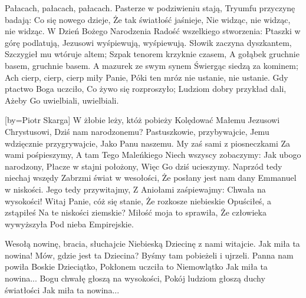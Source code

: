     Pałacach, pałacach, pałacach.
\endchorus
\beginverse
    Pasterze w podziwieniu stają,
    Tryumfu przyczynę badają:
\endverse
\beginchorus
    Co się nowego dzieje,
    Że tak światłość jaśnieje,
    Nie widząc, nie widząc, nie widząc.
\endchorus
\endsong
\beginverse
    W Dzień Bożego Narodzenia
    Radość wszelkiego stworzenia:
    Ptaszki w górę podlatują,
    Jezusowi wyśpiewują, wyśpiewują.
\endverse
\beginverse
    Słowik zaczyna dyszkantem,
    Szczygieł mu wtóruje altem;
    Szpak tenorem krzyknie czasem,
    A gołąbek gruchnie basem, gruchnie basem.
\endverse
\beginverse
    A mazurek ze swym synem
    Świergąc siedzą za kominem;
    Ach cierp, cierp, cierp miły Panie,
    Póki ten mróz nie ustanie, nie ustanie.
\endverse
\beginverse
    Gdy ptactwo Boga uczciło,
    Co żywo się rozproszyło;
    Ludziom dobry przykład dali,
    Ażeby Go uwielbiali, uwielbiali.
\endverse
\endsong

[by={Piotr Skarga}]
\beginverse
    W żłobie leży, któż pobieży
    Kolędować Małemu
    Jezusowi Chrystusowi,
    Dziś nam narodzonemu?
\endverse
\beginchorus
        Pastuszkowie, przybywajcie,
        Jemu wdzięcznie przygrywajcie,
        Jako Panu naszemu.
\endchorus
\beginverse
    My zaś sami z piosneczkami
    Za wami pośpieszymy,
    A tam Tego Maleńkiego
    Niech wszyscy zobaczymy:
\endverse
\beginchorus
        Jak ubogo narodzony,
        Płacze w stajni położony,
        Więc Go dziś ucieszymy.
\endchorus
\beginverse
    Naprzód tedy niechaj wszędy
    Zabrzmi świat w wesołości,
    Że posłany jest nam dany
    Emmanuel w niskości.
\endverse
\beginchorus
        Jego tedy przywitajmy,
        Z Aniołami zaśpiewajmy:
        Chwała na wysokości!
\endchorus
\beginverse
    Witaj Panie, cóż się stanie,
    Że rozkosze niebieskie
    Opuściłeś, a zstąpiłeś
    Na te niskości ziemskie?
\endverse
\beginchorus
        Miłość moja to sprawiła,
        Że człowieka wywyższyła
        Pod nieba Empirejskie.
\endchorus
\endsong

\beginverse
    Wesołą nowinę, bracia, słuchajcie
    Niebieską Dziecinę z nami witajcie.
\endverse
\beginchorus
        Jak miła ta nowina!
        Mów, gdzie jest ta Dziecina?
        Byśmy tam pobieżeli i ujrzeli.
\endchorus
\beginverse
    Panna nam powiła Boskie Dzieciątko,
    Pokłonem uczciła to Niemowlątko
\endverse
\beginchorus
        Jak miła ta nowina...
\endchorus
\beginverse
    Bogu chwałę głoszą na wysokości,
    Pokój ludziom głoszą duchy światłości
\endverse
\beginchorus
        Jak miła ta nowina...
\endchorus

